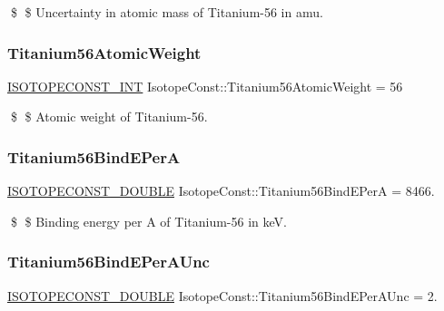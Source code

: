 \$ \$ Uncertainty in atomic mass of Titanium-\/56 in amu. \mbox{\label{group___isotope_const-_titanium-_ti56_ga5f3f2dc4f95b49cd04205985a24712b4}} 
\subsubsection{\texorpdfstring{Titanium56\+Atomic\+Weight}{Titanium56AtomicWeight}}
{\footnotesize\ttfamily \mbox{\hyperlink{group___isotope_const-_macros_ga5f18360b3e99483a35c32d789e62621c}{I\+S\+O\+T\+O\+P\+E\+C\+O\+N\+S\+T\+\_\+\+I\+NT}} Isotope\+Const\+::\+Titanium56\+Atomic\+Weight = 56}

\$ \$ Atomic weight of Titanium-\/56. \mbox{\label{group___isotope_const-_titanium-_ti56_ga4bf607657f9a4f445578841f7f15b97c}} 
\subsubsection{\texorpdfstring{Titanium56\+Bind\+E\+PerA}{Titanium56BindEPerA}}
{\footnotesize\ttfamily \mbox{\hyperlink{group___isotope_const-_macros_ga8f45a7272ce02c0b4c65c44636ed719a}{I\+S\+O\+T\+O\+P\+E\+C\+O\+N\+S\+T\+\_\+\+D\+O\+U\+B\+LE}} Isotope\+Const\+::\+Titanium56\+Bind\+E\+PerA = 8466.}

\$ \$ Binding energy per A of Titanium-\/56 in keV. \mbox{\label{group___isotope_const-_titanium-_ti56_ga1aeb8644b032509baad57d64fe2e71c0}} 
\subsubsection{\texorpdfstring{Titanium56\+Bind\+E\+Per\+A\+Unc}{Titanium56BindEPerAUnc}}
{\footnotesize\ttfamily \mbox{\hyperlink{group___isotope_const-_macros_ga8f45a7272ce02c0b4c65c44636ed719a}{I\+S\+O\+T\+O\+P\+E\+C\+O\+N\+S\+T\+\_\+\+D\+O\+U\+B\+LE}} Isotope\+Const\+::\+Titanium56\+Bind\+E\+Per\+A\+Unc = 2.}

